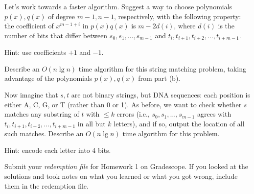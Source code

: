 \begin{qunlist}
\begin{qparts}
\item Let's work towards a faster algorithm.
Suggest a way to choose polynomials $p(x),q(x)$ of degree $m-1,n-1$,
respectively, with the following property:
the coefficient of $x^{m-1+i}$ in $p(x)q(x)$ is $m-2d(i)$,
where $d(i)$ is the number of bits that differ between
$s_0,s_1,\dots,s_{m-1}$ and $t_i,t_{i+1},t_{i+2},\dots,t_{i+m-1}$.

Hint: use coefficients $+1$ and $-1$.

\item Describe an $O(n \lg n)$ time algorithm for this string matching problem,
taking advantage of the polynomials $p(x),q(x)$ from part (b).

\item Now imagine that $s,t$ are not binary strings, but DNA sequences:
each position is either A, C, G, or T (rather than 0 or 1).
As before, we want to check whether $s$ matches any substring of $t$
with $\le k$ errors
(i.e., $s_0,s_1,\dots,s_{m-1}$ agrees with
$t_i,t_{i+1},t_{i+2},\dots,t_{i+m-1}$ in all but $k$ letters),
and if so, output the location of all such matches.
Describe an $O(n \lg n)$ time algorithm for this problem.

Hint: encode each letter into 4 bits.


\end{qparts}


\pagebreak
{}

Submit your \emph{redemption file} for Homework 1 on Gradescope. If you looked at the solutions and took notes on what you learned or what you got wrong, include them in the redemption file. 


\end{qunlist}
